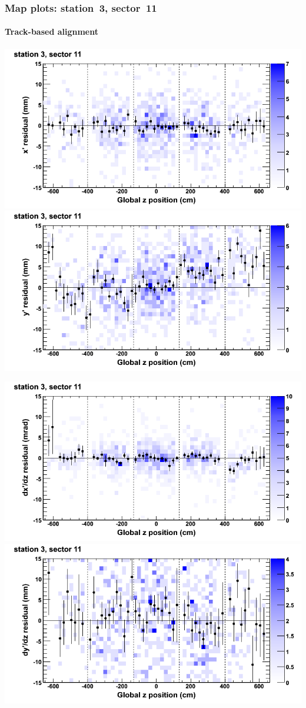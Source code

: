 \documentclass[compress]{beamer}
\begin{document}
\begin{frame}
\frametitle{Map plots: station~3, sector~11}
\framesubtitle{Track-based alignment}
\includegraphics[width=0.5\linewidth]{mapplots_re05/DTvsz_st3sec11_x.png}
\includegraphics[width=0.5\linewidth]{mapplots_re05/DTvsz_st3sec11_y.png}

\includegraphics[width=0.5\linewidth]{mapplots_re05/DTvsz_st3sec11_dxdz.png}
\includegraphics[width=0.5\linewidth]{mapplots_re05/DTvsz_st3sec11_dydz.png}
\end{frame}
\end{document}
